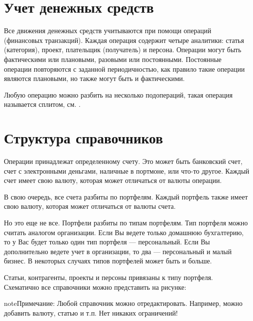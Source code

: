 \documentclass[a4paper,10pt,russian]{sphinxmanual}
\begin{document}
\section{Учет денежных средств}
\label{\detokenize{intro:id2}}
Все движения денежных средств учитываются при помощи операций (финансовых транзакций). Каждая операция содержит
четыре аналитики: статья (категория), проект, плательщик (получатель) и персона. Операции могут быть
фактическими или плановыми, разовыми или постоянными. Постоянные операции повторяются с заданной периодичностью, как правило
такие операции являются плановыми, но также могут быть и фактическими.

Любую операцию можно разбить на несколько подопераций, такая операция называется сплитом, см. {\hyperref[\detokenize{glossary:term}]{}}.


\section{Структура справочников}
\label{\detokenize{intro:id3}}
Операции принадлежат определенному счету. Это может быть банковский счет, счет с электронными деньгами, наличные в портмоне,
или что-то другое. Каждый счет имеет свою валюту, которая может отличаться от валюты операции.

В свою очередь, все счета разбиты по портфелям. Каждый портфель также имеет свою валюту, которая может отличаться от валюты счета.

Но это еще не все. Портфели разбиты по типам портфелям. Тип портфеля можно считать аналогом организации.
Если Вы ведете только домашнюю бухгалтерию, то у Вас будет только один тип портфеля — персональный. Если Вы
дополнительно ведете учет в организации, то два — персональный и малый бизнес. В некоторых случаях типов
портфелей может быть и больше.

Статьи, контрагенты, проекты и персоны привязаны к типу портфеля. Схематично все справочники можно представить на рисунке:


\begin{sphinxadmonition}{note}{Примечание:}
Любой справочник можно отредактировать. Например, можно добавить валюту, статью и т.п. Нет никаких ограничений!
\end{sphinxadmonition}
\end{document}
